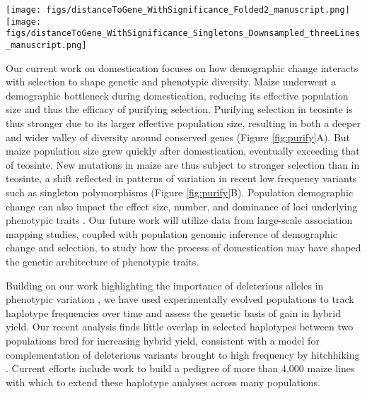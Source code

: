 \documentclass[11pt,letterpaper]{article}
\begin{document}
\begin{figure*}[t]
\centering
\texttt{[image: figs/distanceToGene\_WithSignificance\_Folded2\_manuscript.png]} \texttt{[image: figs/distanceToGene\_WithSignificance\_Singletons\_Downsampled\_threeLines\_manuscript.png]}
\caption{Relative pairwise nucleotide diversity (A) and singleton diversity (B) as a function of distance to the nearest gene. Insets show the same pattern in the region closest to the gene.
\label{fig:purify}}
\end{figure*}

Our current work on domestication focuses on how demographic change interacts with selection to shape genetic and phenotypic diversity.
Maize underwent a demographic bottleneck during domestication, reducing its effective population size and thus the efficacy of purifying selection.
Purifying selection in teosinte is thus stronger due to its larger effective population size, resulting in both a deeper and wider valley of diversity around conserved genes (Figure \ref{fig:purify}A).
But maize population size grew quickly after domestication, eventually exceeding that of teosinte.
New mutations in maize are thus subject to stronger selection than in teosinte, a shift reflected in patterns of variation in recent low frequency variants such as singleton polymorphisms (Figure \ref{fig:purify}B).   
Population demographic change can also impact the effect size, number, and dominance of loci underlying phenotypic traits \citep{lohmueller2014impact,gazave2013population}.
Our future work will utilize data from large-scale association mapping studies, coupled with population genomic inference of demographic change and selection, to study how the process of domestication may have shaped the genetic architecture of phenotypic traits.

Building on our work highlighting the importance of deleterious alleles in phenotypic variation \citep{mezmouk2014pattern}, we have used experimentally evolved populations to track haplotype frequencies over time and assess the genetic basis of gain in hybrid yield. 
Our recent analysis finds little overlap in selected haplotypes between two populations bred for increasing hybrid yield, consistent with a model for complementation of deleterious variants brought to high frequency by hitchhiking  \citep{gerke2013genomic}. 
Current efforts include work to build a pedigree of more than 4,000 maize lines with which to extend these haplotype analyses across many populations.  
\end{document}
